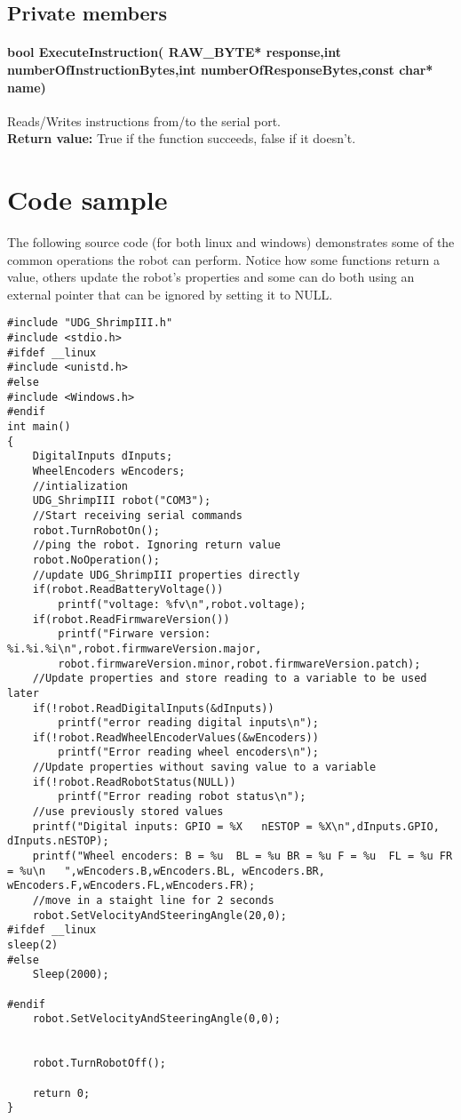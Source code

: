 \documentclass{book}
\begin{document}
\section{Private members}
\subsubsection{	bool ExecuteInstruction( RAW\_BYTE* response,int numberOfInstructionBytes,int numberOfResponseBytes,const char* name)}
Reads/Writes instructions from/to the serial port.\\
\textbf{Return value: }True if the function succeeds, false if it doesn't.\\ 
\chapter{Code sample}
The following source code (for both linux and windows) demonstrates some of the common operations the robot can perform. Notice how some functions return a value, others update the robot's properties and some can do both using an external pointer that can be ignored by setting it to NULL.\\
\begin{lstlisting}
#include "UDG_ShrimpIII.h"
#include <stdio.h>
#ifdef __linux
#include <unistd.h>
#else
#include <Windows.h>
#endif
int main()
{
	DigitalInputs dInputs;
	WheelEncoders wEncoders;
	//intialization
	UDG_ShrimpIII robot("COM3");
	//Start receiving serial commands
	robot.TurnRobotOn();
	//ping the robot. Ignoring return value
	robot.NoOperation();
	//update UDG_ShrimpIII properties directly 
	if(robot.ReadBatteryVoltage())
		printf("voltage: %fv\n",robot.voltage);
	if(robot.ReadFirmwareVersion())
		printf("Firware version: %i.%i.%i\n",robot.firmwareVersion.major,
		robot.firmwareVersion.minor,robot.firmwareVersion.patch);
	//Update properties and store reading to a variable to be used later
	if(!robot.ReadDigitalInputs(&dInputs))
		printf("error reading digital inputs\n");			
	if(!robot.ReadWheelEncoderValues(&wEncoders))
		printf("Error reading wheel encoders\n");
	//Update properties without saving value to a variable
	if(!robot.ReadRobotStatus(NULL))
		printf("Error reading robot status\n");
	//use previously stored values
	printf("Digital inputs: GPIO = %X	nESTOP = %X\n",dInputs.GPIO, dInputs.nESTOP);
	printf("Wheel encoders: B = %u	BL = %u	BR = %u	F = %u	FL = %u	FR = %u\n	",wEncoders.B,wEncoders.BL, wEncoders.BR, wEncoders.F,wEncoders.FL,wEncoders.FR);
	//move in a staight line for 2 seconds
	robot.SetVelocityAndSteeringAngle(20,0);
#ifdef __linux
sleep(2)
#else
	Sleep(2000);

#endif
	robot.SetVelocityAndSteeringAngle(0,0);


	robot.TurnRobotOff();

	return 0;
}
\end{lstlisting}
\end{document}
